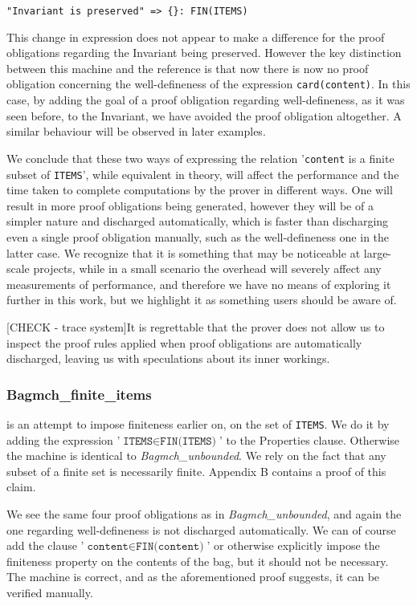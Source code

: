 \documentclass[11pt,journal]{IEEEtran}
\begin{document}
	\begin{lstlisting}
"Invariant is preserved" => {}: FIN(ITEMS)  
	\end{lstlisting}
	
	This change in expression does not appear to make a difference for the proof obligations regarding the Invariant being preserved. However the key distinction between this machine and the reference is that now there is now no proof obligation concerning the well-defineness of the expression \texttt{card(content)}. In this case, by adding the goal of a proof obligation regarding well-defineness, as it was seen before, to the Invariant, we have avoided the proof obligation altogether. A similar behaviour will be observed in later examples.
	
	We conclude that these two ways of expressing the relation '\texttt{content} is a finite subset of \texttt{ITEMS}', while equivalent in theory, will affect the performance and the time taken to complete computations by the prover in different ways. One will result in more proof obligations being generated, however they will be of a simpler nature and discharged automatically, which is faster than discharging even a single proof obligation manually, such as the well-defineness one in the latter case. We recognize that it is something that may be noticeable at large-scale projects, while in a small scenario the overhead will severely affect any measurements of performance, and therefore we have no means of exploring it further in this work, but we highlight it as something users should be aware of.
	
	[CHECK - trace system]It is regrettable that the prover does not allow us to inspect the proof rules applied when proof obligations are automatically discharged, leaving us with speculations about its inner workings.
	       
	\subsubsection{Bagmch\_finite\_items} is an attempt to impose finiteness earlier on, on the set of \texttt{ITEMS}. We do it by adding the expression '$\texttt{ITEMS} \in \texttt{FIN(ITEMS)}$' to the Properties clause. Otherwise the machine is identical to \emph{Bagmch\_unbounded}. We rely on the fact that any subset of a finite set is necessarily finite. Appendix B contains a proof of this claim.
	
	We see the same four proof obligations as in \emph{Bagmch\_unbounded}, and again the one regarding well-defineness is not discharged automatically. We can of course add the clause '$\texttt{content} \in \texttt{FIN(content)}$' or otherwise explicitly impose the finiteness property on the contents of the bag, but it should not be necessary. The machine is correct, and as the aforementioned proof suggests, it can be verified manually.
	
\end{document}
